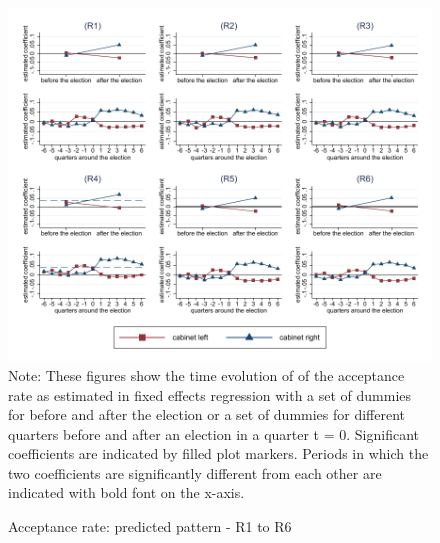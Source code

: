 \documentclass[11pt,a4paper]{scrartcl}
\begin{document}
\clearpage
\FloatBarrier
\begin{figure}[!ht]
	\caption{Acceptance rate: predicted pattern - R1 to R6}
	\includegraphics[width=1\textwidth]{../results/decisions/acceptance_rate_graphs_R1-R6.pdf}
	\scriptsize{Note: These figures show the time evolution of of the acceptance rate as estimated in fixed effects regression with a set of dummies for before and after the election or a set of dummies for different quarters before and after an election in a quarter t = 0. Significant coefficients are indicated by filled plot markers. Periods in which the two coefficients are significantly different from each other are indicated with bold font on the x-axis.}
\end{figure}

\clearpage
\FloatBarrier



\clearpage
\FloatBarrier



\clearpage
\FloatBarrier






\clearpage
\FloatBarrier

\end{document}
